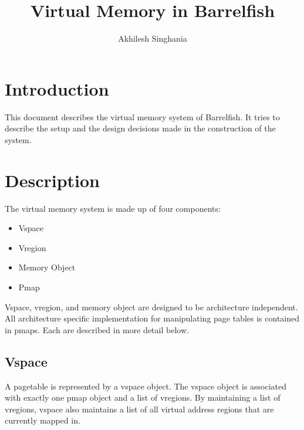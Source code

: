 \documentclass[a4paper,twoside]{report} %
\title{Virtual Memory in Barrelfish}   %
\author{Akhilesh Singhania}	%
\begin{document}
\maketitle

%
%
\begin{versionhistory}
\end{versionhistory}


\chapter{Introduction}

This document describes the virtual memory system of Barrelfish.
It tries to describe the setup and the design decisions made in the construction of the system.

\chapter{Description}

The virtual memory system is made up of four components:

\begin{itemize}
\item Vspace
\item Vregion
\item Memory Object
\item Pmap
\end{itemize}

Vspace, vregion, and memory object are designed to be architecture independent.
All architecture specific implementation for manipulating page tables is contained in pmaps.
Each are described in more detail below.

\section{Vspace}
A pagetable is represented by a vspace object.
The vspace object is associated with exactly one pmap object and a list of vregions.
By maintaining a list of vregions,
vspace also maintains a list of all virtual address regions that are currently mapped in.
\end{document}
